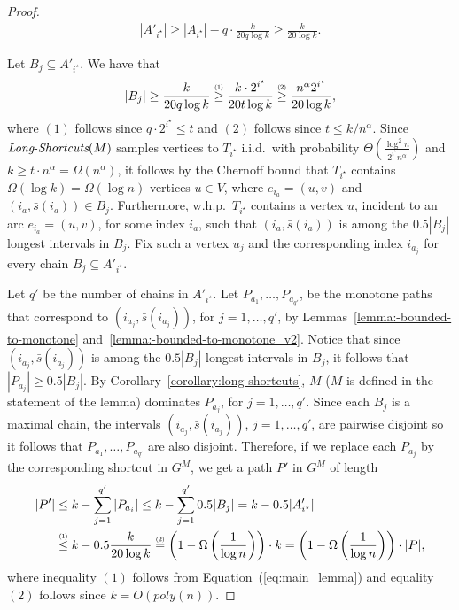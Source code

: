 \documentclass[11pt]{article}
\newcommand{\LS}{\mbox{{\it Long}-{\it Shortcuts}}}
\newcommand\numeq[1]{\stackrel{\scriptscriptstyle(\mkern-1.5mu#1\mkern-1.5mu)}{=}}
\newcommand\numge[1]{\stackrel{\scriptscriptstyle(\mkern-1.5mu#1\mkern-1.5mu)}{\ge}}
\newcommand\numle[1]{\stackrel{\scriptscriptstyle(\mkern-1.5mu#1\mkern-1.5mu)}{\le}}
\begin{document}
\begin{proof}
    \begin{align}\label{eq:main_lemma}
        |A'_{i^\star}| 
    \ge  |A_{i^\star}| - q \cdot \frac{k}{20q \log  k}
    \ge \frac{k}{20 \log 
  k}.
    \end{align}

    Let $B_j \subseteq A'_{i^\star}$. 
    We have that
    \begin{align*}
        |B_j| \ge \frac{k}{20q \log k} \numge{1} \frac{k \cdot 2^{i^\star}}{20t \log k} \numge{2} \frac{n^\alpha 2^{i^\star}}{20 \log k},
    \end{align*}
    where $(1)$ follows since $q\cdot 2^{i^\star}\le t$ and $(2)$ follows since $t \le k / n^\alpha$.
    Since $\LS(M)$ samples vertices to $T_{i^\star}$ i.i.d.\ with probability $\Theta(\frac{\log^2 n}{2^{i^\star}n^\alpha})$ and $k \ge t \cdot n^\alpha = \Omega(n^\alpha)$, it follows by the Chernoff bound that $T_{i^\star}$ contains $\Omega(\log k) = \Omega(\log n)$  vertices $u\in V$, where $e_{i_a}=(u,v)$ and $(i_a , \bar{s}(i_a))\in B_j$. Furthermore, w.h.p.\ $T_{i^\star}$ contains a vertex $u$, incident to an arc $e_{i_a}=(u,v)$, for some index $i_a$, such that $(i_a, \bar{s}(i_a))$ is among the $0.5|B_j|$ longest intervals in $B_j$. Fix such a vertex $u_j$ and the corresponding index $i_{a_j}$ for every chain $B_j\subseteq A'_{i^\star}$.
    

    Let $q'$ be the number of chains in $A'_{i^\star}$. Let $P_{a_1},\ldots, P_{a_{q'}}$,  be the monotone paths that correspond to $(i_{a_j}, \bar{s}(i_{a_j}))$, for $j=1,\ldots, q'$, by Lemmas~\ref{lemma:-bounded-to-monotone} and~\ref{lemma:-bounded-to-monotone_v2}.
    Notice that since $(i_{a_j}, \bar{s}(i_{a_j}))$ is among the $0.5|B_j|$ longest intervals in $B_j$, it follows that $|P_{a_j}|\ge 0.5 |B_j|$.
    By Corollary~\ref{corollary:long-shortcuts}, $\bar{M}$ ($\bar{M}$ is defined in the statement of the lemma) dominates $P_{a_j}$, for $j=1,\ldots,q'$. Since each $B_j$ is a maximal chain, the intervals $(i_{a_j}, \bar{s}(i_{a_j}))$, $j=1,\ldots,q'$, are pairwise disjoint so it follows that $P_{a_1},\ldots, P_{a_{q'}}$ are also disjoint. Therefore, if we replace each $P_{a_j}$ by the corresponding shortcut in $G^{\bar{M}}$, we get a path $P'$ in $G^{\bar{M}}$ of length
    \begin{align*}
       |P'| &\le k - \sum_{j=1}^{q'} {|P_{a_i}|} \le k - \sum_{j=1}^{q'} {0.5 |B_j|} =
       k - 0.5 |A'_{i^\star}| \\
       &\numle{1} k -0.5 \frac{k}{20\log k} \numeq{2} 
       \left(1 - \Omega\left(\frac{1}{\log n} \right) \right) \cdot k = 
       \left(1 - \Omega\left(\frac{1}{\log n} \right) \right) \cdot |P|,
    \end{align*}
    where inequality $(1)$ follows from Equation~(\ref{eq:main_lemma}) and equality $(2)$ follows since $k = O(poly(n))$.


\end{proof}
\end{document}
